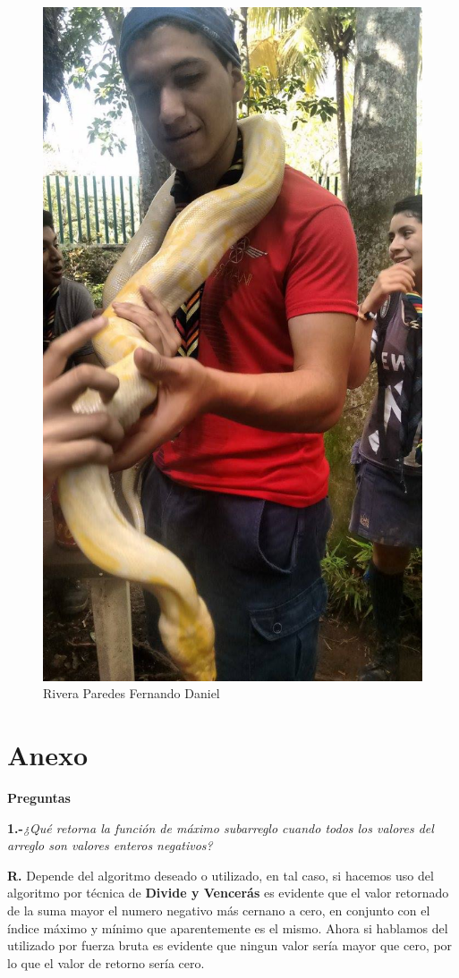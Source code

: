 \documentclass[12pt,twoside]{article}
\begin{document}
\begin{figure}[h]
\begin{minipage}[t]{10cm}
		\includegraphics[scale=0.2]{Foto2}
		\caption{Rivera Paredes Fernando Daniel}
	\end{minipage}
\end{figure}
\newpage
\section{Anexo}
\centerline{\textbf{Preguntas}}

\textbf{1.-}\textit{¿Qué retorna la función de máximo subarreglo cuando todos los valores del arreglo son valores enteros negativos?}
\centerline{}
\textbf{R.} Depende del algoritmo deseado o utilizado, en tal caso, si hacemos uso del algoritmo por técnica de \textbf{Divide y Vencerás}
es evidente que el valor retornado de la suma mayor el numero negativo más cernano a cero, en conjunto con el índice máximo y mínimo
que aparentemente es el mismo. Ahora si hablamos del utilizado por fuerza bruta es evidente que ningun valor sería mayor que cero,
por lo que el valor de retorno sería cero.
\newpage
\end{document}

